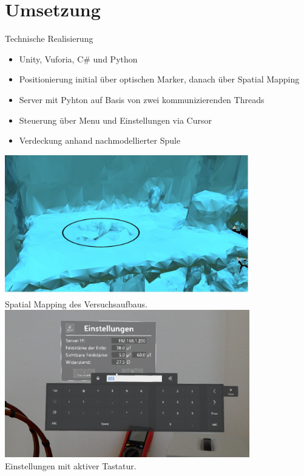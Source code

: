 \part{Umsetzung}
\begin{frame}[fragile]{Technische Realisierung}
\pause
\begin{minipage}{0.5\textwidth}
	{
		\begin{itemize}[itemsep=1mm]
			\item Unity, Vuforia, C\# und Python
			\item Positionierung initial über optischen Marker, danach über Spatial Mapping			
			\item Server mit Pyhton auf Basis von zwei kommunizierenden Threads
			\item Steuerung über Menu und Einstellungen via Cursor
			\item Verdeckung anhand nachmodellierter Spule
		\end{itemize}
	}
\end{minipage}
\pause
\begin{minipage}{0.45\textwidth}
	\centering
	\includegraphics[width=0.8\textwidth]{images/HL/mesh.JPG}\\
	\scriptsize Spatial Mapping des Versuchsaufbaus.
	\includegraphics[width=0.8\textwidth]{images/HL/settings_c.jpg}\\
	\scriptsize Einstellungen mit aktiver Tastatur.
\end{minipage}
\end{frame}


